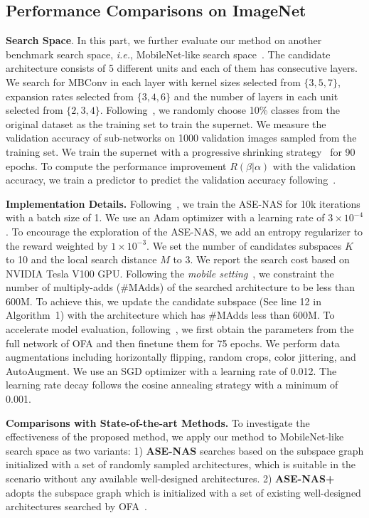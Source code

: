 \documentclass[lettersize,journal]{IEEEtran}
\newcommand{\sexyname}{ASE-NAS\xspace}
\newcommand{\sexynameplus}{ASE-NAS+\xspace}
\def\ie{\emph{i.e.}} \def\Ie{\emph{I.e.}}
\begin{document}
\subsection{Performance Comparisons on ImageNet}

\textbf{Search Space}.
In this part, we further evaluate our method on another benchmark search space, \ie, MobileNet-like search space~\cite{howard2019searching}.
The candidate architecture consists of 5 different units and each of them has consecutive layers.
We search for MBConv in each layer with kernel sizes selected from $\{3, 5, 7\}$, expansion rates selected from $\{3, 4, 6\}$ and the number of layers in each unit selected from $\{2, 3, 4\}$.
Following~\cite{wu2019fbnet}, we randomly choose 10\% classes from the original dataset as the training set to train the supernet.
We measure the validation accuracy of sub-networks on 1000 validation images sampled from the training set.
We train the supernet with a progressive shrinking strategy~\cite{Cai2020Once} for 90 epochs.
To compute the performance improvement $R(\beta|\alpha)$ with the validation accuracy, we train a predictor to predict the validation accuracy following~\cite{Cai2020Once}. 



\textbf{Implementation Details.}
Following~\cite{pham2018efficient}, we train the \sexyname for 10k iterations with a batch size of 1.
We use an Adam optimizer with a learning rate of $3\times10^{-4}$.
To encourage the exploration of the \sexyname, we add an entropy regularizer to the reward weighted by $1\times10^{-3}$.
We set the number of candidates subspaces $K$ to 10 and the local search distance $M$ to 3.
We report the search cost based on NVIDIA Tesla V100 GPU.
Following the \textit{mobile setting}~\cite{liu2018darts}, we constraint the number of multiply-adds (\#MAdds) of the searched architecture to be less than 600M.
To achieve this, we update the candidate subspace (See line 12 in Algorithm~1) with the architecture which has \#MAdds less than 600M.
To accelerate model evaluation, following~\cite{Cai2020Once,lu2020neural}, we first obtain the parameters from the full network of OFA and then finetune them for 75 epochs. 
We perform data augmentations including horizontally flipping, random crops, color jittering, and AutoAugment.
We use an SGD optimizer with a learning rate of 0.012.
The learning rate decay follows the cosine annealing strategy with a minimum of 0.001.




\textbf{Comparisons with State-of-the-art Methods.}
To investigate the effectiveness of the proposed method, we apply our method to MobileNet-like search space as two variants:
1) \textbf{\sexyname} searches based on the subspace graph initialized with a set of randomly sampled architectures, which is suitable in the scenario without any available well-designed architectures.
2) \textbf{\sexynameplus} adopts the subspace graph which is initialized with a set of existing well-designed architectures searched by OFA~\cite{Cai2020Once}.
\end{document}
